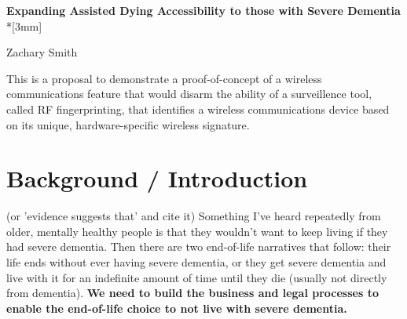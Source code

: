 \documentclass{proposalnsf}
\begin{document}
\begin{center}
    \begin{spacing}{1.75}
      {\Large{\bf Expanding Assisted Dying Accessibility to those with Severe Dementia}}\\*[3mm]
    \end{spacing}

Zachary Smith 

\end{center}


This is a proposal to demonstrate a proof-of-concept of a wireless communications feature that would disarm the ability of a surveillence tool, called RF fingerprinting, that identifies a wireless communications device based on its unique, hardware-specific wireless signature.


\tableofcontents


\noindent

\noindent


\renewcommand{\thepage} {B--\arabic{page}}

\newpage


\renewcommand{\thepage} {D--\arabic{page}}

\newpage

%
%



\section{Background / Introduction}
(or 'evidence suggests that' and cite it) Something I've heard repeatedly from older, mentally healthy people is that they wouldn't want to keep living if they had severe dementia. Then there are two end-of-life narratives that follow: their life ends without ever having severe dementia, or they get severe dementia and live with it for an indefinite amount of time until they die (usually not directly from dementia). \textbf{We need to build the business and legal processes to enable the end-of-life choice to not live with severe dementia.}
\\
\end{document}
